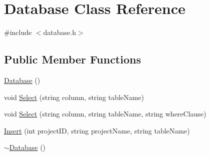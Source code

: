 \hypertarget{classDatabase}{\section{Database Class Reference}
\label{classDatabase}
}


{\ttfamily \#include $<$database.\-h$>$}

\subsection*{Public Member Functions}
\begin{DoxyCompactItemize}
\item 
\hyperlink{classDatabase_a4703c80e6969d33565ea340f768fdadf}{Database} ()
\item 
void \hyperlink{classDatabase_aaa4186192d40229b61e2b910a4aa8fa0}{Select} (string column, string table\-Name)
\item 
void \hyperlink{classDatabase_a6cb8f64ba23bf85d3161e7c17771dd89}{Select} (string column, string table\-Name, string where\-Clause)
\item 
\hyperlink{classDatabase_a2cf59655e870fe29cd5b18c0c47444e9}{Insert} (int project\-I\-D, string project\-Name, string table\-Name)
\item 
\hyperlink{classDatabase_a84d399a2ad58d69daab9b05330e1316d}{$\sim$\-Database} ()
\end{DoxyCompactItemize}
